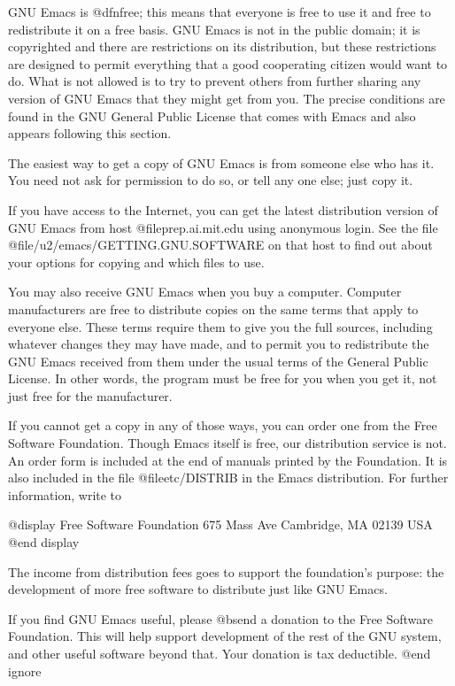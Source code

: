 GNU Emacs is @dfn{free}; this means that everyone is free to use it and
free to redistribute it on a free basis.  GNU Emacs is not in the public
domain; it is copyrighted and there are restrictions on its
distribution, but these restrictions are designed to permit everything
that a good cooperating citizen would want to do.  What is not allowed
is to try to prevent others from further sharing any version of GNU
Emacs that they might get from you.  The precise conditions are found in
the GNU General Public License that comes with Emacs and also appears
following this section.

The easiest way to get a copy of GNU Emacs is from someone else who has it.
You need not ask for permission to do so, or tell any one else; just copy
it.

If you have access to the Internet, you can get the latest distribution
version of GNU Emacs from host @file{prep.ai.mit.edu} using anonymous
login.  See the file @file{/u2/emacs/GETTING.GNU.SOFTWARE} on that host
to find out about your options for copying and which files to use.

You may also receive GNU Emacs when you buy a computer.  Computer
manufacturers are free to distribute copies on the same terms that apply to
everyone else.  These terms require them to give you the full sources,
including whatever changes they may have made, and to permit you to
redistribute the GNU Emacs received from them under the usual terms of the
General Public License.  In other words, the program must be free for you
when you get it, not just free for the manufacturer.

If you cannot get a copy in any of those ways, you can order one from the
Free Software Foundation.  Though Emacs itself is free, our distribution
service is not.  An order form is included at the end of manuals printed by
the Foundation.  It is also included in the file @file{etc/DISTRIB} in the
Emacs distribution.  For further information, write to

@display
Free Software Foundation
675 Mass Ave
Cambridge, MA 02139
USA
@end display

The income from distribution fees goes to support the foundation's
purpose: the development of more free software to distribute just like
GNU Emacs.

If you find GNU Emacs useful, please @b{send a donation} to the Free
Software Foundation.  This will help support development of the rest of the
GNU system, and other useful software beyond that.  Your donation is tax
deductible.
@end ignore

